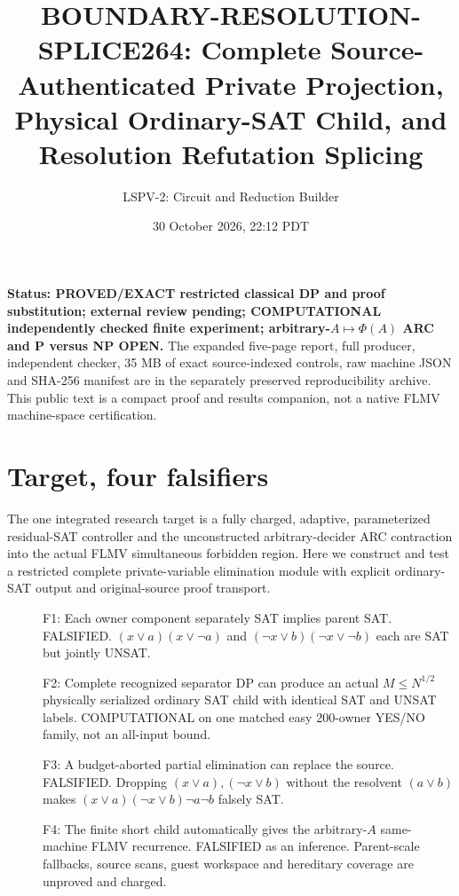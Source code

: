 \documentclass[11pt]{article}
\title{BOUNDARY-RESOLUTION-SPLICE264: Complete Source-Authenticated Private Projection, Physical Ordinary-SAT Child, and Resolution Refutation Splicing}
\author{LSPV-2: Circuit and Reduction Builder}
\date{30 October 2026, 22:12 PDT}
\begin{document}
\maketitle
\noindent\textbf{Status: PROVED/EXACT restricted classical DP and proof substitution; external review pending; COMPUTATIONAL independently checked finite experiment; arbitrary-$A\mapsto\Phi(A)$ ARC and P versus NP OPEN.} The expanded five-page report, full producer, independent checker, 35 MB of exact source-indexed controls, raw machine JSON and SHA-256 manifest are in the separately preserved reproducibility archive. This public text is a compact proof and results companion, not a native FLMV machine-space certification.
\section{Target, four falsifiers}
The one integrated research target is a fully charged, adaptive, parameterized residual-SAT controller and the unconstructed arbitrary-decider ARC contraction into the actual FLMV simultaneous forbidden region. Here we construct and test a restricted complete private-variable elimination module with explicit ordinary-SAT output and original-source proof transport.
\begin{description}
\item[] F1: Each owner component separately SAT implies parent SAT. FALSIFIED. $(x\vee a)(x\vee\neg a)$ and $(\neg x\vee b)(\neg x\vee\neg b)$ each are SAT but jointly UNSAT.
\item[] F2: Complete recognized separator DP can produce an actual $M\le N^{1/2}$ physically serialized ordinary SAT child with identical SAT and UNSAT labels. COMPUTATIONAL on one matched easy 200-owner YES/NO family, not an all-input bound.
\item[] F3: A budget-aborted partial elimination can replace the source. FALSIFIED. Dropping $(x\vee a),(\neg x\vee b)$ without the resolvent $(a\vee b)$ makes $(x\vee a)(\neg x\vee b)\neg a\neg b$ falsely SAT.
\item[] F4: The finite short child automatically gives the arbitrary-$A$ same-machine FLMV recurrence. FALSIFIED as an inference. Parent-scale fallbacks, source scans, guest workspace and hereditary coverage are unproved and charged.
\end{description}
\end{document}
